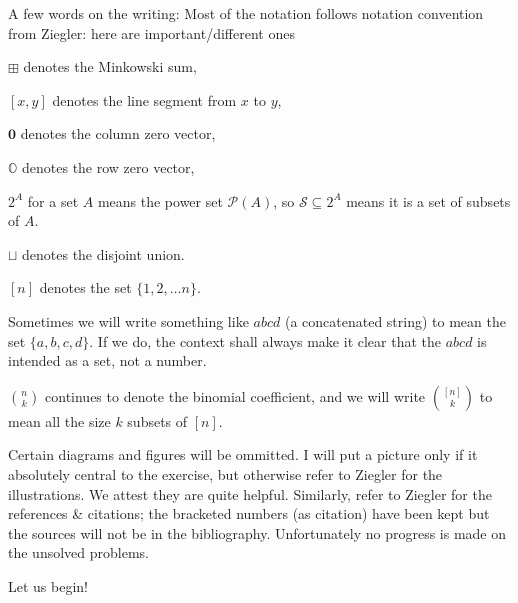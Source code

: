 \documentclass{article}
\begin{document}
\bigskip
A few words on the writing: Most of the notation follows notation convention from Ziegler: here are important/different ones

\smallskip
$\boxplus$ denotes the Minkowski sum,

$[x,y]$ denotes the line segment from $x$ to $y$,

$\textbf{0}$ denotes the column zero vector,

$\mathds{O}$ denotes the row zero vector,

$2^A$ for a set $A$ means the power set $\mathcal{P}(A)$, so $\mathcal{S} \subseteq 2^A$ means it is a set of subsets of $A$.

$\sqcup$ denotes the disjoint union.

$[n]$ denotes the set $\{1, 2, \ldots n\}$.

Sometimes we will write something like $abcd$ (a concatenated string) to mean the set $\{a,b,c,d\}$. If we do, the context shall always make it clear that the $abcd$ is intended as a set, not a number.

$\binom{n}{k}$ continues to denote the binomial coefficient, and we will write $\binom{[n]}{k}$ to mean all the size $k$ subsets of $[n]$.

Certain diagrams and figures will be ommitted. I will put a picture only if it absolutely central to the exercise, but otherwise refer to Ziegler  \cite{ziegler-lectures-polytopes} for the illustrations. We attest they are quite helpful. Similarly, refer to Ziegler for the references \& citations; the bracketed numbers (as citation) have been kept but the sources will not be in the bibliography. Unfortunately no progress is made on the unsolved problems.

Let us begin!

\setcounter{section}{-1}
\bigskip
\end{document}

